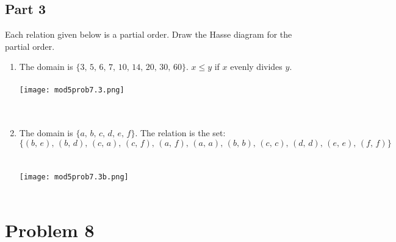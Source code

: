 \documentclass{amsart}
\theoremstyle{definition}
\theoremstyle{Exercise}
\theoremstyle{remark}
\theoremstyle{rule}
\numberwithin{equation}{section}
\begin{document}
\subsection*{Part 3}
Each relation given below is a partial order. Draw the Hasse diagram for the partial order.

\begin{enumerate}[label=(\alph*)]
\item The domain is $\{3,\, 5,\, 6,\, 7,\, 10,\, 14,\, 20,\, 30,\, 60\}$. $x \leq y$ if $x$ evenly divides $y$.\\\\

\texttt{[image: mod5prob7.3.png]}
\\\\
\\
\item The domain is $\{a,\, b,\, c,\, d,\, e,\, f\}$. The relation is the set:
\[
\{ (b,\, e),\, (b,\, d),\, (c,\, a),\, (c,\, f),\, (a,\, f),\, (a,\, a),\, (b,\, b),\, (c, \,c),\, (d,\, d),\, (e, \,e), \,(f,\, f) \}
\]\\\\

\texttt{[image: mod5prob7.3b.png]}
\\\\

\end{enumerate}

\newpage%

\section*{Problem 8}
\end{document}
